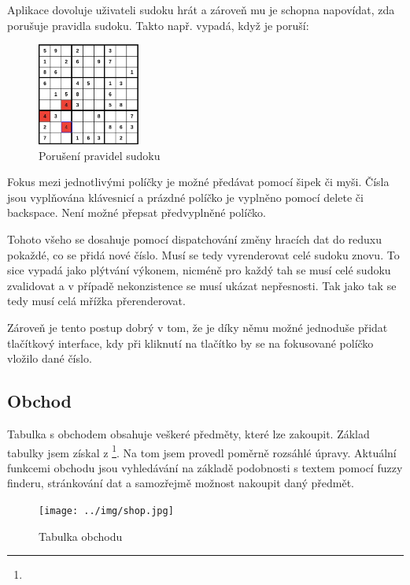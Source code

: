\documentclass[a4paper,oneside,12pt]{report}
\begin{document}
Aplikace dovoluje uživateli sudoku hrát a zároveň mu je schopna napovídat, zda porušuje pravidla sudoku. Takto např. vypadá, když je poruší: 

\begin{figure}[H]
   \centering
   \includegraphics[width=0.3\textwidth]{../img/badSudoku.jpg}
   \caption[Porušení pravidel sudoku]{Porušení pravidel sudoku}
   \label{fig:architecture}
\end{figure}

Fokus mezi jednotlivými políčky je možné předávat pomocí šipek či myši. Čísla jsou vyplňována klávesnicí a prázdné políčko je vyplněno pomocí delete či backspace. Není možné přepsat předvyplněné políčko. 

Tohoto všeho se dosahuje pomocí dispatchování změny hracích dat do reduxu pokaždé, co se přidá nové číslo. Musí se tedy vyrenderovat celé sudoku znovu. To sice vypadá jako plýtvání výkonem, nicméně pro každý tah se musí celé sudoku zvalidovat a v případě nekonzistence se musí ukázat nepřesnosti. Tak jako tak se tedy musí celá mřížka přerenderovat. 

Zároveň je tento postup dobrý v tom, že je díky němu možné jednoduše přidat tlačítkový interface, kdy při kliknutí na tlačítko by se na fokusované políčko vložilo dané číslo.

\subsection{Obchod}
Tabulka s obchodem obsahuje veškeré předměty, které lze zakoupit. Základ tabulky jsem získal z \footnote{}. Na tom jsem provedl poměrně rozsáhlé úpravy. Aktuální funkcemi obchodu jsou vyhledávání na základě podobnosti s textem pomocí fuzzy finderu, stránkování dat a samozřejmě možnost nakoupit daný předmět.


\begin{figure}[H]
   \centering
   \texttt{[image: ../img/shop.jpg]}
   \caption[Tabulka obchodu]{Tabulka obchodu}
   \label{fig:architecture}
\end{figure}
\end{document}
